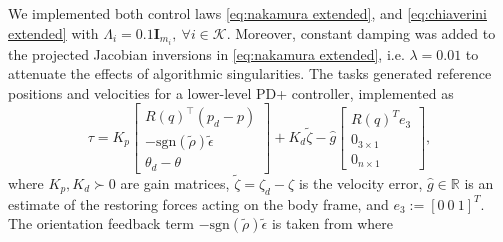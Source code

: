 \documentclass[../main.tex]{subfiles}
\begin{document}
We implemented both control laws \eqref{eq:nakamura extended}, and \eqref{eq:chiaverini extended} with $\Lambda_i = 0.1\bm{I}_{m_i},\ \forall i \in \mathcal{K}$. Moreover, constant damping was added to the projected Jacobian inversions in \eqref{eq:nakamura extended}, i.e. \( \lambda = 0.01 \) to attenuate the effects of algorithmic singularities.
%
%
The tasks generated reference positions and velocities for a lower-level PD+ controller, implemented as
\begin{equation}
    \tau =  K_p
    \begin{bmatrix}
        R(q)^\top(p_d-p) \\
        -\mathrm{sgn} (\tilde{\rho}) \tilde{\epsilon} \\
        \theta_d - \theta
    \end{bmatrix}
    + K_d \tilde{\zeta}
    - \hat{g}\begin{bmatrix}
        R(q)^T e_3 \\ 0_{3\times 1} \\ 0_{n\times 1}
    \end{bmatrix},
\end{equation}
where \( K_p, K_d \succ 0 \) are gain matrices, $\tilde{\zeta} = \zeta_d - \zeta$ is the velocity error, $\hat{g} \in \mathbb{R}$  is an estimate of the restoring forces acting on the body frame, and $e_3 := [0\ 0\ 1]^T$. The orientation feedback term \( -\mathrm{sgn} (\tilde{\rho}) \tilde{\epsilon} \) is taken from \cite{fjellstad1994} where
\end{document}
